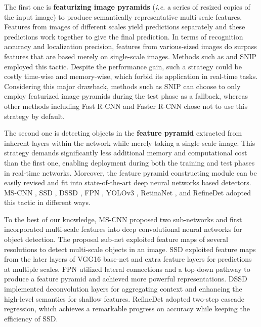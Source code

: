 \documentclass[letterpaper]{article} \usepackage{aaai18}  \usepackage{times}  \usepackage{helvet}  \usepackage{courier}  \usepackage{url}  \usepackage{graphicx}
\begin{document}
The first one is \textbf{featurizing image pyramids} (\textit{i.e.} a series of resized copies of the input image) to produce semantically representative multi-scale features. Features from images of different scales yield predictions separately and these predictions work together to give the final prediction. In terms of recognition accuracy and localization precision, features from various-sized images do surpass features that are based merely on single-scale images. Methods such as \cite{ShrivastavaGG16} and SNIP \cite{abs-1711-08189} employed this tactic. Despite the performance gain, such a strategy could be costly time-wise and memory-wise, which forbid its application in real-time tasks. Considering this major drawback, methods such as SNIP \cite{abs-1711-08189} can choose to only employ featurized image pyramids during the test phase as a fallback, whereas other methods including Fast R-CNN \cite{Girshick15} and Faster R-CNN \cite{RenHGS15} chose not to use this strategy by default.

The second one is detecting objects in the \textbf{feature pyramid} extracted from inherent layers within the network while merely taking a single-scale image. This strategy demands significantly less additional memory and computational cost than the first one, enabling deployment during both the training and test phases in real-time networks. Moreover, the feature pyramid constructing module can be easily revised and fit into state-of-the-art deep neural networks based detectors. MS-CNN \cite{CaiFFV16}, SSD \cite{LiuAESRFB16}, DSSD \cite{FuLRTB17}, FPN \cite{LinDGHHB17}, YOLOv3 \cite{yolov3}, RetinaNet \cite{LinGGHD17}, and RefineDet \cite{abs-1711-06897} adopted this tactic in different ways.

To the best of our knowledge, MS-CNN \cite{CaiFFV16} proposed two sub-networks and first incorporated multi-scale features into deep convolutional neural networks for object detection. The proposal sub-net exploited feature maps of several resolutions to detect multi-scale objects in an image. SSD \cite{LiuAESRFB16} exploited feature maps from the later layers of VGG16 base-net and extra feature layers for predictions at multiple scales. FPN \cite{LinDGHHB17} utilized lateral connections and a top-down pathway to produce a feature pyramid and achieved more powerful representations. 
DSSD \cite{FuLRTB17} implemented deconvolution layers for aggregating context and enhancing the high-level semantics for shallow features. RefineDet \cite{abs-1711-06897} adopted two-step cascade regression, which achieves a remarkable progress on accuracy while keeping the efficiency of SSD.
\end{document}
